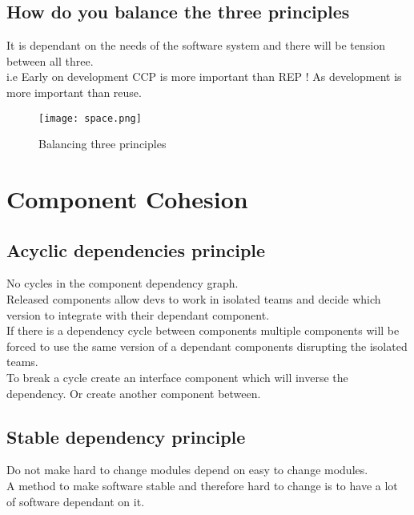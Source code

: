 \documentclass[11pt]{scrartcl} %
\begin{document}
\subsection{How do you balance the three principles}

It is dependant on the needs of the software system and there will be
tension between all three.\\

i.e Early on development CCP is more important than REP ! As development
is more important than reuse.

\begin{figure}[h] %
	\centering
	\texttt{[image: space.png]} %
	\caption{Balancing three principles}
\end{figure}

\section{Component Cohesion}

\subsection{Acyclic dependencies principle}

No cycles in the component dependency graph.\\

Released components allow devs to work in isolated teams and decide
which version to integrate with their dependant component.\\

If there is a dependency cycle between components multiple components
will be forced to use the same version of a dependant components
disrupting the isolated teams.\\

To break a cycle create an interface component which will inverse the
dependency. Or create another component between.

\subsection{Stable dependency principle}

Do not make hard to change modules depend on easy to change modules.\\

A method to make software stable and therefore hard to change is to have
a lot of software dependant on it.
\end{document}
